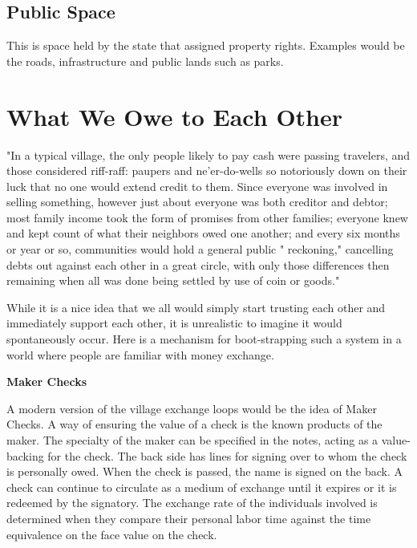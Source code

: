 \documentclass{article}
\begin{document}
\subsection{Public Space} This is space held by the state that assigned property rights. Examples would be the roads, infrastructure and public lands such as parks. 



\pagebreak
{\section{What We Owe to Each Other}}


	
\begin{minipage}[t]{2.7in}
	\vspace{0pt}
	"In a typical village, the only people likely to pay cash were passing
	travelers, and those considered riff-raff: paupers and ne'er-do-wells so
	notoriously down on their luck that no one would extend credit to
	them. Since everyone was involved in selling something, however just
	about everyone was both creditor and debtor; most family income took
	the form of promises from other families; everyone knew and kept
	count of what their neighbors owed one another; and every six months
	or year or so, communities would hold a general public " reckoning,"
	cancelling debts out against each other in a great circle, with only those
	differences then remaining when all was done being settled by use of
	coin or goods." \footnotemark
	
	\vspace{0.2cm}
	
	While it is a nice idea that we all would simply start trusting each other and immediately support each other, it is unrealistic to imagine it would spontaneously occur. Here is a mechanism for boot-strapping such a system in a world where people are familiar with money exchange. 
	
{\centering \textbf{Maker Checks}\par}
	
	A modern version of the village exchange loops would be the idea of Maker Checks. A way of ensuring the value of a check is the known products of the maker. The specialty of the maker can be specified in the notes, acting as a value-backing for the check. The back side has lines for signing over to whom the check is personally owed. When the check is passed, the name is signed on the back. A check can continue to circulate as a medium of exchange until it expires or it is redeemed by the signatory. The exchange rate of the individuals involved is determined when they compare their personal labor time against the time equivalence on the face value on the check.
	

\end{minipage}
\end{document}
